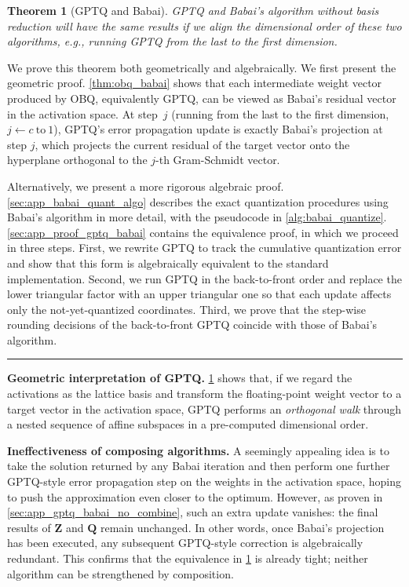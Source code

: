 \documentclass{article} %
\newcommand{\BlackBox}{\rule{1.5ex}{1.5ex}}  %
\renewenvironment{proof}{\par\noindent{\bf Proof\ }}{\hfill\BlackBox\par}
\newenvironment{proof}{\par\noindent{\bf Proof\ }}{\hfill\BlackBox\par}
\newtheorem{theorem}{Theorem}
\begin{document}
\begin{theorem}[GPTQ and Babai]
\label{thm:gptq_babai}
GPTQ and Babai's algorithm without basis reduction will have the same results if we align the dimensional order of these two algorithms, e.g., running GPTQ from the last to the first dimension.
\end{theorem}
\begin{proof}
We prove this theorem both geometrically and algebraically.
We first present the geometric proof.
\cref{thm:obq_babai} shows that each intermediate weight vector produced by OBQ, equivalently GPTQ, can be viewed as Babai's residual vector in the activation space.
At step~$j$ (running from the last to the first dimension, $j \leftarrow c \ \mathrm{to} \ 1$), GPTQ's error propagation update is exactly Babai's projection at step $j$, which projects the current residual of the target vector onto the hyperplane orthogonal to the $j$-th Gram-Schmidt vector.

Alternatively, we present a more rigorous algebraic proof.
\cref{sec:app_babai_quant_algo} describes the exact quantization procedures using Babai's algorithm in more detail, with the pseudocode in \cref{alg:babai_quantize}.
\cref{sec:app_proof_gptq_babai} contains the equivalence proof, in which we proceed in three steps. First, we rewrite GPTQ to track the cumulative quantization error and show that this form is algebraically equivalent to the standard implementation. Second, we run GPTQ in the back-to-front order and replace the lower triangular factor with an upper triangular one so that each update affects only the not-yet-quantized coordinates. Third, we prove that the step-wise rounding decisions of the back-to-front GPTQ coincide with those of Babai's algorithm.
\end{proof}

\textbf{Geometric interpretation of GPTQ.}
\cref{thm:gptq_babai} shows that, if we regard the activations as the lattice basis and transform the floating-point weight vector to a target vector in the activation space, GPTQ performs an \emph{orthogonal walk} through a nested sequence of affine subspaces in a pre-computed dimensional order.

\textbf{Ineffectiveness of composing algorithms.}
A seemingly appealing idea is to take the solution returned by any Babai iteration and then perform one further GPTQ-style error propagation step on the weights in the activation space, hoping to push the approximation even closer to the optimum.
However, as proven in \cref{sec:app_gptq_babai_no_combine}, such an extra update vanishes: the final results of $\bm{Z}$ and $\bm{Q}$ remain unchanged.
In other words, once Babai's projection has been executed, any subsequent GPTQ-style correction is algebraically redundant.
This confirms that the equivalence in \cref{thm:gptq_babai} is already tight; neither algorithm can be strengthened by composition.
\end{document}
